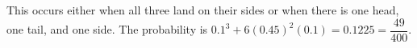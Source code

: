 This occurs either when all three land on their sides or when there is one head, one tail, and one side. The probability is $0.1^3+6(0.45)^2(0.1)=0.1225=\boxed{\dfrac{49}{400}}$.
